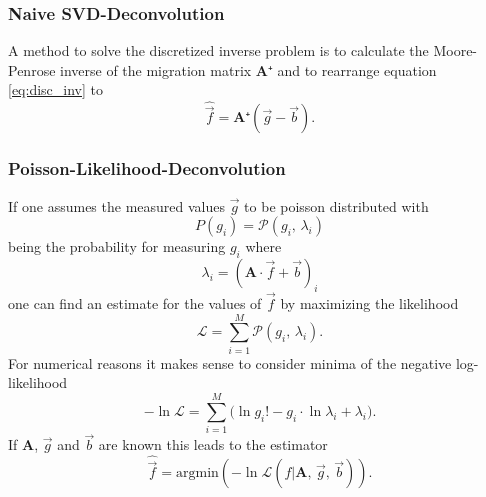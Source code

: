 \subsubsection{Naive SVD-Deconvolution}

A method to solve the discretized inverse problem is to calculate the Moore-Penrose inverse of the migration matrix $\textbf{A}⁺$ and to rearrange
equation \eqref{eq:disc_inv} to
\begin{equation}
    \hat{\vec{f}} = \textbf{A}⁺ ( \vec{g} - \vec{b} ) .
\end{equation}

\subsubsection{Poisson-Likelihood-Deconvolution}
If one assumes the measured values $\vec{g}$ to be poisson distributed with
\begin{equation}
    P(g_i) = \mathcal{P}(g_i , \, \lambda_i)
\end{equation}
being the probability for measuring $g_i$ where
\begin{equation}
    \lambda_i = (\textbf{A} \cdot \vec {f} + \vec{b})_i
\end{equation}
one can find an estimate for the values of $\vec{f}$ by maximizing the likelihood
\begin{equation}
    \mathcal{L} = \sum_{i=1}^M \mathcal{P}(g_i, \, \lambda_i) .
\end{equation}
For numerical reasons it makes sense to consider minima of the negative log-likelihood
\begin{equation}
    - \ln \mathcal{L} = \sum_{i=1}^M \biggl( \ln g_i! - g_i \cdot \ln \lambda_i + \lambda_i \biggr) .
\end{equation}
If $\textbf{A}$, $\vec{g}$ and $\vec{b}$ are known this leads to the estimator
\begin{equation}
    \hat{ \vec{f}} = \text{argmin} ( - \ln \mathcal{L} (f | \textbf{A}, \, \vec{g}, \, \vec{b})).
\end{equation}

